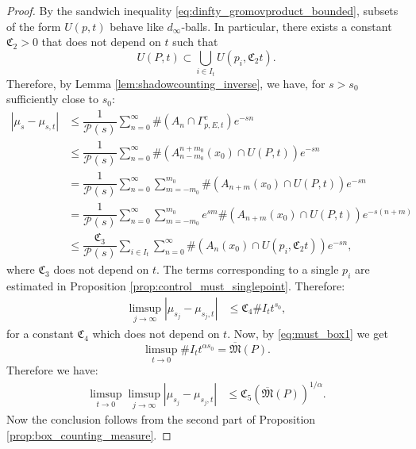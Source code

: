 \documentclass[12pt]{amsbook}%
\theoremstyle{definition}
\theoremstyle{remark}
\numberwithin{section}{chapter}
\numberwithin{subsection}{section}
\numberwithin{figure}{chapter}
\def\dyl{>0}
\def\cP{{\mathscr{P}}}
\def\fC{{\mathfrak{C}}}
\def\fM{{\mathfrak{M}}}
\def\al{\alpha}
\def\ol{\overline}
\def\kap{}
\begin{document}
{{\begin{proof}
By the sandwich inequality \eqref{eq:dinfty_gromovproduct_bounded}, subsets of the form $U(p,t)$ behave like $d_\infty$-balls. In particular, there exists a constant $\fC_2\dyl$ that does not depend on $t$ 
such that
\[
U(P,t)\subset \bigcup_{i\in I_t}U(p_i,\fC_2t).
\]
Therefore, by Lemma \ref{lem:shadowcounting_inverse}, we have, for $s>s_0$ sufficiently close to $s_0$:
\begin{align*}
|\mu_s - \mu_{s,t}| 
   & \leqslant \dfrac{1}{\cP(s)} \sum_{n=0}^\infty  \# (A_n \cap \Gamma_{p,E,t}^c) e^{-sn} \\
   & \leqslant \dfrac{1}{\cP(s)} \sum_{n=0}^\infty  \# (A_{n-m_0}^{n+m_0}(x_0) \cap U(P,t) ) e^{-sn}\\
   & = \dfrac{1}{\cP(s)} \sum_{n=0}^\infty \sum_{m=-m_0}^{m_0} \# (A_{n+m}(x_0) \cap U(P,t) ) e^{-sn}\\
   & =\dfrac{1}{\cP(s)} \sum_{n=0}^\infty \sum_{m=-m_0}^{m_0}e^{sm} \# (A_{n+m}(x_0) \cap U(P,t) ) e^{-s(n+m)}\\
   &  \leqslant \dfrac{\fC_3 }{\cP(s)}\sum_{i\in I_t}\sum_{n=0}^\infty  \# (A_n(x_0) \cap U(p_i,\fC_2t) ) e^{-sn},
\end{align*}
where $\fC_3$ does not depend on $t$. 
The terms corresponding to a single $p_i$ are estimated in Proposition \ref{prop:control_must_singlepoint}. Therefore:
\begin{align*}
\limsup_{j\rightarrow\infty}|\mu_{s_j} - \mu_{s_j,t}| 
   & \leqslant \fC_4\#I_t t^{s_0},
\end{align*}
for a constant $\fC_4$ which does not depend on $t$. 
Now, by \eqref{eq:must_box1} we get 
\[\limsup_{t\rightarrow 0}\#I_t t^{\alpha s_0}=\ol{\fM}(P).\]
Therefore we have:
\begin{align*}
\limsup_{t\rightarrow 0}\limsup_{j\rightarrow\infty}|\mu_{s_j} - \mu_{s_j,t}| 
   & \leqslant \fC_5\left(\ol{\fM}(P)\right)^{1/\al}.
\end{align*}
Now the conclusion follows from the second part of Proposition \ref{prop:box_counting_measure}.
\end{proof}




}}
\end{document}
